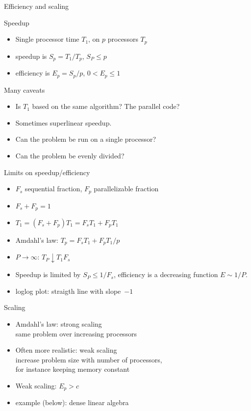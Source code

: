  {Efficiency and scaling}

\begin{frame}{Speedup}
  \begin{itemize}
  \item Single processor time $T_1$, on $p$ processors $T_p$
  \item speedup is $S_p=T_1/T_p$, $S_P\leq p$
  \item efficiency is $E_p=S_p/p$, $0< E_p\leq 1$
  \end{itemize}
Many caveats
\begin{itemize}
\item Is $T_1$ based on the same algorithm? The parallel code?
\item Sometimes superlinear speedup.
\item Can the problem be run on a single processor?
\item Can the problem be evenly divided?
\end{itemize}
\end{frame}

\begin{frame}{Limits on speedup/efficiency}
  \begin{itemize}
  \item $F_s$ sequential fraction, $F_p$ parallelizable fraction
  \item $F_s+F_p=1$
  \item $T_1 = (F_s+F_p)T_1 = F_sT_1 + F_pT_1 $
  \item Amdahl's law: $T_p = F_sT_1 + F_pT_1/p $
  \item $P\rightarrow\infty$: $T_P\downarrow T_1F_s$
  \item Speedup is limited by $S_P\leq 1/F_s$,
    efficiency is a decreasing function $E\sim 1/P$.
  \item loglog plot: straigth line with slope~$-1$
  \end{itemize}  
\end{frame}

\begin{frame}{Scaling}
  \begin{itemize}
  \item Amdahl's law: strong scaling\\
    same problem over increasing processors
  \item Often more realistic: weak scaling\\
    increase problem size with number of processors,\\
    for instance keeping memory constant
  \item Weak scaling: $E_p>c$
  \item example (below): dense linear algebra
  \end{itemize}
\end{frame}


